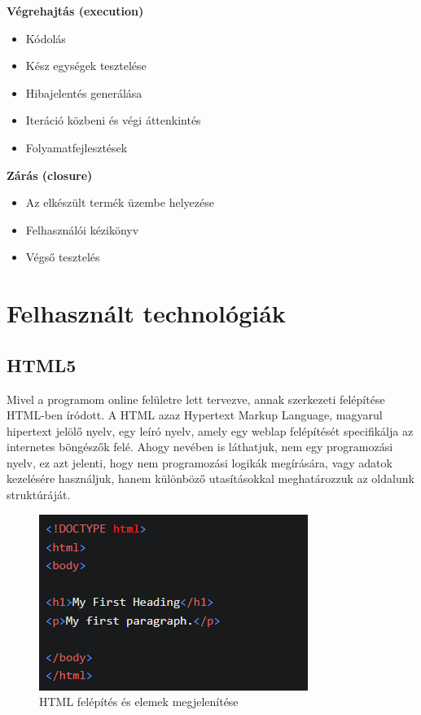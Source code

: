 \textbf{Végrehajtás (execution)}
\begin{itemize}
\item Kódolás
\item Kész egységek tesztelése
\item Hibajelentés generálása
\item Iteráció közbeni és végi áttenkintés
\item Folyamatfejlesztések
\end{itemize}

\textbf{Zárás (closure)}
\begin{itemize}
\item Az elkészült termék üzembe helyezése
\item Felhasználói kézikönyv
\item Végső tesztelés
\end{itemize}

\section{Felhasznált technológiák}

\subsection{HTML5}
Mivel a programom online felületre lett tervezve, annak szerkezeti felépítése HTML-ben íródott. A HTML azaz Hypertext Markup Language, magyarul hipertext jelölő nyelv, egy leíró nyelv, amely egy weblap felépítését specifikálja az internetes böngészők felé. Ahogy nevében is láthatjuk, nem egy programozási nyelv, ez azt jelenti, hogy nem programozási logikák megírására, vagy adatok kezelésére használjuk, hanem különböző utasításokkal meghatározzuk az oldalunk struktúráját. \\

\begin{figure}[h]
\centering
\includegraphics[scale=0.8]{images/htmlExample.png}
\caption{HTML felépítés és elemek megjelenítése}
\end{figure}

